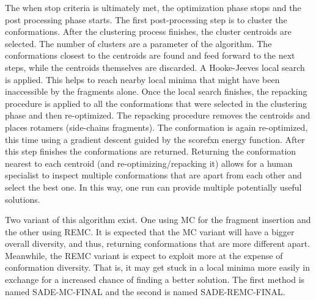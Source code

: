 The when stop criteria is ultimately met, the optimization phase stops and the
post processing phase starts. The first post-processing step is to cluster the
conformations. After the clustering process finishes, the cluster centroids are
selected. The number of clusters are a parameter of the algorithm.
The conformations closest to the centroids are found and feed forward
to the next steps, while the centroids themselves are discarded. A Hooke-Jeeves
local search is applied. This helps to reach nearby local minima that might have
been inaccessible by the fragments alone. Once the local search finishes, the
repacking procedure is applied to all the conformations that were selected in
the clustering phase and then re-optimized. The repacking procedure removes the
centroids and places rotamers (side-chains fragments). The conformation is again
re-optimized, this time using a gradient descent guided by the scorefxn energy
function. After this step finishes the conformations are returned. Returning
the conformation nearest to each centroid (and re-optimizing/repacking it) allows
for a human specialist to inspect multiple conformations that are apart from
each other and select the best one. In this way, one run can provide multiple
potentially useful solutions.

Two variant of this algorithm exist. One using \ac{MC} for the fragment insertion
and the other using \ac{REMC}. It is expected that the \ac{MC} variant will have
a bigger overall diversity, and thus, returning conformations that are more
different apart. Meanwhile, the \ac{REMC} variant is expect to exploit more at
the expense of conformation diversity. That is, it may get stuck in a local
minima more easily in exchange for a increased chance of finding a better solution.
The first method is named SADE-MC-FINAL and the second is named SADE-REMC-FINAL.